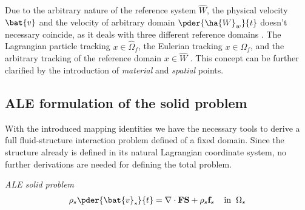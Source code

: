 Due to the arbitrary nature of the reference system $\hat{W}$, the physical velocity $\bat{v}$ and the velocity of arbitrary domain $\pder{\ha{W}_w}{t}$ doesn't necessary coincide, as it deals with three different reference domains \cite{Richter2016}. The Lagrangian particle tracking $x \in \hat{\Omega}_f $, the Eulerian tracking $x \in \Omega_f $, and the arbitrary tracking of the reference domain  $x \in \hat{W} $ \cite{Richter2016}. This concept can be further clarified by the introduction of \textit{material} and \textit{spatial} points. 
\subsection{ALE formulation of the solid problem}
With the introduced mapping identities we have the necessary tools to derive a full fluid-structure interaction problem defined of a fixed domain. Since the structure already is defined in its natural Lagrangian coordinate system, no further derivations are needed for defining the total problem.
\begin{equat}
\textit{ALE solid problem}
\begin{align}
\rho_s \pder{\bat{v}_s}{t} = \nabla \cdot \mathbf{F}\mathbf{S} + \rho_s \mathbf{f}_s
\hspace{4mm} \text{in} \hspace{2mm} \Omega_s \\
\end{align}
\end{equat}
